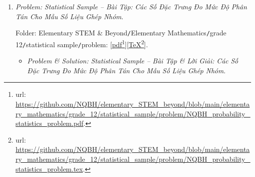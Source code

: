 \documentclass[12pt]{article}
\begin{document}
\begin{enumerate}
	Folder: {\sf Elementary STEM \& Beyond{\tt/}Elementary Mathematics{\tt/}grade 12{\tt/}3D vector{\tt/}problem}: [\href{https://github.com/NQBH/elementary_STEM_beyond/blob/main/elementary_mathematics/grade_12/3D_vector/problem/NQBH_3D_vector_problem.pdf}{pdf}\footnote{{\sc url}: \url{https://github.com/NQBH/elementary_STEM_beyond/blob/main/elementary_mathematics/grade_12/3D_vector/problem/NQBH_3D_vector_problem.pdf}.}][\href{https://github.com/NQBH/elementary_STEM_beyond/blob/main/elementary_mathematics/grade_12/3D_vector/problem/NQBH_3D_vector_problem.tex}{\TeX}\footnote{{\sc url}: \url{https://github.com/NQBH/elementary_STEM_beyond/blob/main/elementary_mathematics/grade_12/3D_vector/problem/NQBH_3D_vector_problem.tex}.}].
	\begin{itemize}
		\item {\it Problem \& Solution: Coordinates of Vectors in 3D Space -- Bài Tập \& Lời Giải: Tọa Độ Của Vector Trong Không Gian}.
		
		Folder: {\sf Elementary STEM \& Beyond{\tt/}Elementary Mathematics{\tt/}grade 12{\tt/}3D vector {\tt/}solution}: [\href{https://github.com/NQBH/elementary_STEM_beyond/blob/main/elementary_mathematics/grade_12/3D_vector/solution/NQBH_3D_vector_solution.pdf}{pdf}\footnote{{\sc url}: \url{https://github.com/NQBH/elementary_STEM_beyond/blob/main/elementary_mathematics/grade_12/3D_vector/solution/NQBH_3D_vector_solution.pdf}.}][\href{https://github.com/NQBH/elementary_STEM_beyond/blob/main/elementary_mathematics/grade_12/3D_vector/solution/NQBH_3D_vector_solution.tex}{\TeX}\footnote{{\sc url}: \url{https://github.com/NQBH/elementary_STEM_beyond/blob/main/elementary_mathematics/grade_12/3D_vector/solution/NQBH_3D_vector_solution.tex}.}].
	\end{itemize}
	\item {\it Problem: Statistical Sample -- Bài Tập: Các Số Đặc Trưng Đo Mức Độ Phân Tán Cho Mẫu Số Liệu Ghép Nhóm}.
	
	Folder: {\sf Elementary STEM \& Beyond{\tt/}Elementary Mathematics{\tt/}grade 12{\tt/}statistical sample{\tt/}problem}: [\href{https://github.com/NQBH/elementary_STEM_beyond/blob/main/elementary_mathematics/grade_12/statistical_sample/problem/NQBH_probability_statistics_problem.pdf}{pdf}\footnote{{\sc url}: \url{https://github.com/NQBH/elementary_STEM_beyond/blob/main/elementary_mathematics/grade_12/statistical_sample/problem/NQBH_probability_statistics_problem.pdf}.}][\href{https://github.com/NQBH/elementary_STEM_beyond/blob/main/elementary_mathematics/grade_12/statistical_sample/problem/NQBH_probability_statistics_problem.tex}{\TeX}\footnote{{\sc url}: \url{https://github.com/NQBH/elementary_STEM_beyond/blob/main/elementary_mathematics/grade_12/statistical_sample/problem/NQBH_probability_statistics_problem.tex}.}].
	\begin{itemize}
		\item {\it Problem \& Solution: Statistical Sample -- Bài Tập \& Lời Giải: Các Số Đặc Trưng Đo Mức Độ Phân Tán Cho Mẫu Số Liệu Ghép Nhóm}.
		

\end{itemize}
\end{enumerate}
\end{document}
